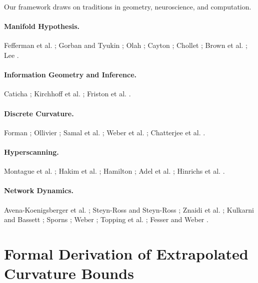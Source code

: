 \documentclass{article}
\theoremstyle{definition}
\begin{document}
Our framework draws on traditions in geometry, neuroscience, and computation.

\paragraph{Manifold Hypothesis.} Fefferman et al. \cite{fefferman2016testing}; Gorban and Tyukin \cite{gorban2018blessing}; Olah \cite{olah2014blog}; Cayton \cite{cayton2005algorithms}; Chollet \cite{chollet2021deep}; Brown et al. \cite{brown2023union}; Lee \cite{lee2023geometric}.

\paragraph{Information Geometry and Inference.} Caticha \cite{caticha2015geometry}; Kirchhoff et al. \cite{kirchhoff2018markov}; Friston et al. \cite{friston2017graphical}.

\paragraph{Discrete Curvature.} Forman \cite{forman2003bochner}; Ollivier \cite{ollivier2009ricci}; Samal et al. \cite{samal2018comparative}; Weber et al. \cite{weber2019curvature}; Chatterjee et al. \cite{chatterjee2021detecting}.

\paragraph{Hyperscanning.} Montague et al. \cite{montague2002hyperscanning}; Hakim et al. \cite{hakim2023quantification}; Hamilton \cite{hamilton2021hyperscanning}; Adel et al. \cite{adel2025systematic}; Hinrichs et al. \cite{hinrichs2025hyperscanning,hinrichs2025geometry}.

\paragraph{Network Dynamics.} Avena-Koenigsberger et al. \cite{avena2019spectrum}; Steyn-Ross and Steyn-Ross \cite{steyn2010modeling}; Znaidi et al. \cite{znaidi2023unified}; Kulkarni and Bassett \cite{kulkarni2024towards}; Sporns \cite{sporns2010networks}; Weber \cite{weber2025geometric}; Topping et al. \cite{topping2022understanding}; Fesser and Weber \cite{fesser2023mitigating}.


\appendix\section{Formal Derivation of Extrapolated Curvature Bounds}
\label{sec:curvature-entropy-bounds}
\end{document}
